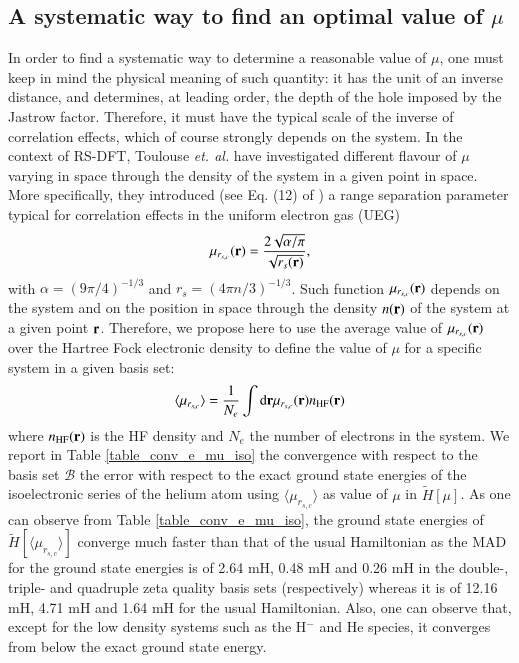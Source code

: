 \documentclass[aip,jcp,reprint,noshowkeys,superscriptaddress]{revtex4-1}
\newcommand{\basis}[0]{\mathcal{B}}
\newcommand{\mursc}{ \mu_{r_{s,c}}}
\newcommand{\murscav}{\langle \mu_{r_{s,c}}\rangle}
\begin{document}
\subsection{A systematic way to find an optimal value of $\mu$ }
In order to find a systematic way to determine a reasonable value of $\mu$, one must keep in mind the physical meaning of such quantity: it has the unit of an inverse distance, and determines, at leading order, the depth of the hole imposed by the Jastrow factor. 
Therefore, it must have the typical scale of the inverse of correlation effects, which of course strongly depends on the system. In the context of RS-DFT, Toulouse \textit{et. al.}\cite{TouColSav-JCP-05} have investigated different flavour of $\mu$ varying in space through the density of the system in a given point in space. 
More specifically, they introduced (see Eq. (12) of ) a range separation parameter typical for correlation effects in the uniform electron gas (UEG) 
\begin{equation}
 \mursc({\bf r}) =  \frac{2\sqrt{\alpha / \pi}}{\sqrt{r_s({\bf r})}},
\end{equation}
with $\alpha = (9 \pi/4)^{-1/3}$ and $r_s = (4 \pi n/3)^{-1/3}$. 
Such function $\mursc({\bf r})$ depends on the system and on the position in space through the density $n({\bf r})$ of the system at a given point ${\bf r}$. 
Therefore, we propose here to use the average value of $\mursc({\bf r})$ over the Hartree Fock electronic density to define the value of $\mu$ for a specific system in a given basis set:
\begin{equation}
 \murscav = \frac{1}{N_e}\int \text{d}{\bf r} \mursc({\bf r}) n_{\text{HF}}({\bf r}) 
\end{equation}
where $n_{\text{HF}}({\bf r})$ is the HF density and $N_e$ the number of electrons in the system. 
We report in Table \ref{table_conv_e_mu_iso} the convergence with respect to the basis set $\basis$ the error with respect to the exact ground state energies of the isoelectronic series of the helium atom using $\murscav$ as value of $\mu$ in $\tilde{H}[\mu]$. 
As one can observe from  Table \ref{table_conv_e_mu_iso}, the ground state energies of $\tilde{H}[\murscav]$ converge much faster than that of the usual Hamiltonian as the MAD for the ground state energies is of 2.64 mH, 0.48 mH and 0.26 mH in the double-, triple- and quadruple zeta quality basis sets (respectively) whereas it is of 12.16 mH, 4.71 mH and 1.64 mH for the usual Hamiltonian. Also, one can observe that, except for the low density systems such as the H${^-}$ and He species, it converges from below the exact ground state energy. 
\end{document}
